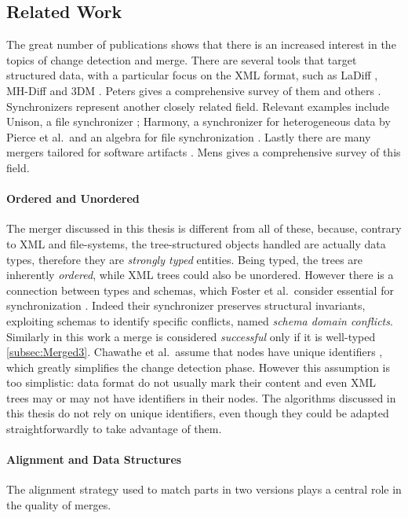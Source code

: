 \documentclass[../Thesis.tex]{subfiles}
\begin{document}
	\subsection{Related Work}
	\label{subsec:RelatedWork}
	The great number of publications shows that there is an increased 
	interest in the topics of change detection and merge.
	There are several tools that target structured data, with a particular
	focus on the XML format, such as 
	LaDiff \cite{Chawathe96}, MH-Diff  \cite{Chawathe97} and 3DM  
	\cite{Lind01, Lind04, Lind05}.
	Peters gives a comprehensive survey of them and others	
	\cite{PetersSurvey}.
	Synchronizers represent another closely related field.
	Relevant examples include Unison, a file synchronizer \cite{Pierce98, 
	UnisonSpec}; Harmony, a synchronizer for 
	heterogeneous data	\cite{HarmonyOverview,Pierce07} by Pierce et al.\ and
	an algebra for file synchronization \cite{Ramsey01}.
	Lastly there are many mergers tailored for software artifacts
	\cite{Westfechtel91, Apel11}.
	Mens gives a comprehensive survey of this field\cite{Mens02}.

	\paragraph{Ordered and Unordered}
	The merger discussed in this thesis is different from all of these, because,
	contrary to XML and file-systems, the tree-structured objects handled
	are actually data types, therefore they are \emph{strongly typed} entities.
	Being typed, the trees are inherently \emph{ordered}, while XML trees
	could also be unordered. 
	However there is a connection between types and schemas, 
	which Foster et al.\ consider essential for synchronization \cite{Pierce07}.
	Indeed their synchronizer preserves structural 
	invariants,  exploiting schemas to identify specific conflicts, 
	named \emph{schema domain conflicts}. Similarly in this work a
	merge is considered \emph{successful} only if it is well-typed 
	\ref{subsec:Merged3}. 
	Chawathe et al.\ assume that nodes have unique 
	identifiers \cite{Chawathe96}, 
	which greatly simplifies the change detection phase.
	However this assumption is too simplistic: data format do not usually mark
	their content and even XML trees may or may not have  
	identifiers in their nodes. The algorithms discussed in this thesis do
	not rely on unique identifiers, even though they could be adapted 
	straightforwardly to take advantage of them.
	
	\paragraph{Alignment and Data Structures}
	The alignment strategy used to match parts in two versions plays
	a central role in the quality of merges.
\end{document}

